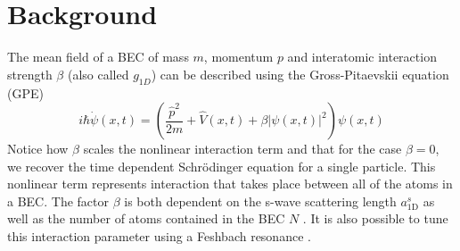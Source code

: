 \documentclass[a4paper, twocolumn]{revtex4-1}
\begin{document}
\section{\label{sec:back}Background}
The mean field of a BEC of mass $m$, momentum $p$ and interatomic interaction strength $\beta$ (also called $g_{1D}$) can be described using the Gross-Pitaevskii equation (GPE)
\begin{equation}
	i\hbar \dot{\psi}(x,t)= \left( \frac{\hat{p}^2}{2m} + \hat{V}(x,t) + \beta |\psi(x,t)|^2 \right)\psi(x,t)
	\label{eq:Hbec}
\end{equation}
Notice how $\beta$ scales the nonlinear interaction term and that for the case $\beta=0$, we recover the time dependent Schrödinger equation for a single particle. This nonlinear term represents interaction that takes place between all of the atoms in a BEC. The factor $\beta$ is both dependent on the s-wave scattering length $a_{\text{1D}}^s$ as well as the number of atoms contained in the BEC $N$ \cite{Schmiedmayer}. It is also possible to tune this interaction parameter using a Feshbach resonance \cite{Feshbach}. \\ 
\end{document}
